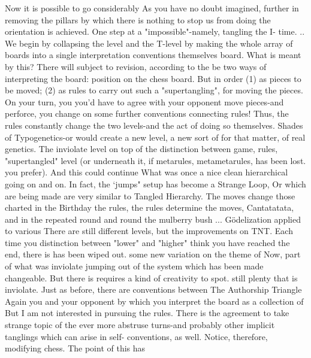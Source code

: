 Now it is possible to go considerably                   As you have no doubt imagined,
further in removing the pillars by which        there is nothing to stop us from doing the
orientation is achieved. One step at a          "impossible"-namely, tangling the I-
time. .. We begin by collapsing the             level and the T-level by making the
whole array of boards into a single             interpretation conventions themselves
board. What is meant by this? There will        subject to revision, according to the
be two ways of interpreting the board:          position on the chess board. But in order
(1) as pieces to be moved; (2) as rules         to carry out such a "supertangling",
for moving the pieces. On your turn, you        you'd have to agree with your opponent
move pieces-and perforce, you change            on some further conventions connecting
rules! Thus, the rules constantly change        the two levels-and the act of doing so
themselves. Shades of Typogenetics-or           would create a new level, a new sort of
for that matter, of real genetics. The          inviolate level on top of the
distinction between game, rules,                "supertangled" level (or underneath it, if
metarules, metametarules, has been lost.        you prefer). And this could continue
What was once a nice clean hierarchical         going on and on. In fact, the `jumps"
setup has become a Strange Loop, Or             which are being made are very similar to
Tangled Hierarchy. The moves change             those charted in the Birthday
the rules, the rules determine the moves,       Cantatatata, and in the repeated
round and round the mulberry bush ...           Gödelization      applied     to    various
There are still different levels, but the       improvements on TNT. Each time you
distinction between "lower" and "higher"        think you have reached the end, there is
has been wiped out.                             some new variation on the theme of
        Now, part of what was inviolate         jumping out of the system which
has been made changeable. But there is          requires a kind of creativity to spot.
still plenty that is inviolate. Just as
before, there are conventions between           The Authorship Triangle Again
you and your opponent by which you
interpret the board as a collection of          But I am not interested in pursuing the
rules. There is the agreement to take           strange topic of the ever more abstruse
turns-and probably other implicit               tanglings which can arise in self-
conventions, as well. Notice, therefore,        modifying chess. The point of this has
